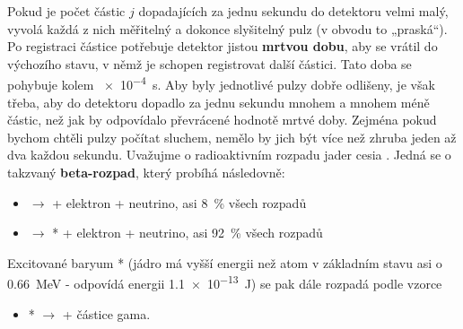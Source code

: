 \begin{example}
  Pokud je počet částic \(j\) dopadajících za jednu sekundu do detektoru velmi malý, vyvolá každá z 
  nich měřitelný a dokonce slyšitelný pulz (v obvodu to „praská“). Po registraci částice potřebuje 
  detektor jistou \textbf{mrtvou dobu}, aby se vrátil do výchozího stavu, v němž je schopen 
  registrovat další částici. Tato doba se pohybuje kolem \SI{e-4}{s}. Aby byly jednotlivé pulzy 
  dobře odlišeny, je však třeba, aby do detektoru dopadlo za jednu sekundu mnohem a mnohem méně 
  částic, než jak by odpovídalo převrácené hodnotě mrtvé doby. Zejména pokud bychom chtěli pulzy 
  počítat sluchem, nemělo by jich být více než zhruba jeden až dva každou sekundu. Uvažujme o 
  radioaktivním rozpadu jader cesia . Jedná se o takzvaný \textbf{beta-rozpad}, který 
  probíhá následovně:
  \begin{itemize}
    \item {} \(\longrightarrow\)  + elektron + neutrino, asi \SI{8}{\percent} 
          všech rozpadů
    \item {} \(\longrightarrow\) * + elektron + neutrino, asi \SI{92}{\percent} 
          všech rozpadů
  \end{itemize}
  Excitované baryum * (jádro má vyšší energii než atom  v základním stavu 
  asi o \SI{0.66}{\mega\electronvolt}  - odpovídá energii \SI{1.1e-13}{\joule}) se pak dále rozpadá 
  podle vzorce
  \begin{itemize}
    \item {}* \(\longrightarrow\)  + částice gama.
  \end{itemize}


\end{example}
